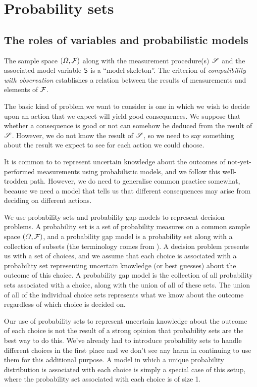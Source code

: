 

\section{Probability sets}\label{sec:vague_variables}

\subsection{The roles of variables and probabilistic models}

The sample space $(\Omega,\mathcal{F})$ along with the measurement procedure(s) $\mathscr{S}$ and the associated model variable $\mathsf{S}$ is a ``model skeleton''. The criterion of \emph{compatibility with observation} establishes a relation between the results of measurements and elements of $\mathcal{F}$.

The basic kind of problem we want to consider is one in which we wish to decide upon an action that we expect will yield good consequences. We suppose that whether a consequence is good or not can somehow be deduced from the result of $\mathscr{S}$. However, we do not know the result of $\mathscr{S}$, so we need to say something about the result we expect to see for each action we could choose.

It is common to to represent uncertain knowledge about the outcomes of not-yet-performed measurements using probabilistic models, and we follow this well-trodden path. However, we do need to generalise common practice somewhat, because we need a model that tells us that different consequences may arise from deciding on different actions.

We use probability sets and probability gap models to represent decision problems. A probability set is a set of probability measures on a common sample space $(\Omega,\mathcal{F})$, and a probability gap model is a probability set along with a collection of subsets (the terminology comes from \citet{hajek_what_2003}). A decision problem presents us with a set of choices, and we assume that each choice is associated with a probability set representing uncertain knowledge (or best guesses) about the outcome of this choice. A probability gap model is the collection of all probability sets associated with a choice, along with the union of all of these sets. The union of all of the individual choice sets represents what we know about the outcome regardless of which choice is decided on.

Our use of probability sets to represent uncertain knowledge about the outcome of each choice is not the result of a strong opinion that probability sets are the best way to do this. We've already had to introduce probability sets to handle different choices in the first place and we don't see any harm in continuing to use them for this additional purpose. A model in which a unique probability distribution is associated with each choice is simply a special case of this setup, where the probability set associated with each choice is of size 1.

